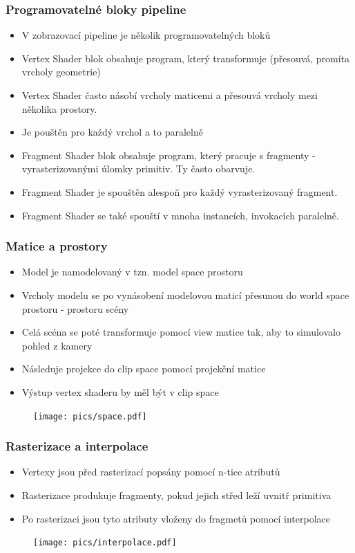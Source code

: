 \begin{frame}
\frametitle{Programovatelné bloky pipeline}
	\begin{itemize}
		\item V zobrazovací pipeline je několik programovatelných bloků
    \item Vertex Shader blok obsahuje program, který transformuje (přesouvá, promíta vrcholy geometrie)
    \item Vertex Shader často násobí vrcholy maticemi a přesouvá vrcholy mezi několika prostory.
    \item Je pouštěn pro každý vrchol a to paralelně
    \item Fragment Shader blok obsahuje program, který pracuje s fragmenty - vyrasterizovanými úlomky primitiv. Ty často obarvuje.
    \item Fragment Shader je spouštěn alespoň pro každý vyrasterizovaný fragment.
    \item Fragment Shader se také spouští v mnoha instancích, invokacích paralelně.
	\end{itemize}
\end{frame}


\begin{frame}
\frametitle{Matice a prostory}
	\begin{itemize}
		\item Model je namodelovaný v tzn. model space prostoru
    \item Vrcholy modelu se po vynásobení modelovou maticí přesunou do world space prostoru - prostoru scény
    \item Celá scéna se poté transformuje pomocí view matice tak, aby to simulovalo pohled z kamery
    \item Následuje projekce do clip space pomocí projekční matice
    \item Výstup vertex shaderu by měl být v clip space
	\end{itemize}
  \begin{figure}[h]
    \texttt{[image: pics/space.pdf]}
  \end{figure}
\end{frame}

\begin{frame}
\frametitle{Rasterizace a interpolace}
	\begin{itemize}
		\item Vertexy jsou před rasterizací popsány pomocí n-tice atributů
    \item Rasterizace produkuje fragmenty, pokud jejich střed leží uvnitř primitiva
    \item Po rasterizaci jsou tyto atributy vloženy do fragmetů pomocí interpolace
	\end{itemize}
	\begin{figure}[h]
		\texttt{[image: pics/interpolace.pdf]}
	\end{figure}
\end{frame}


